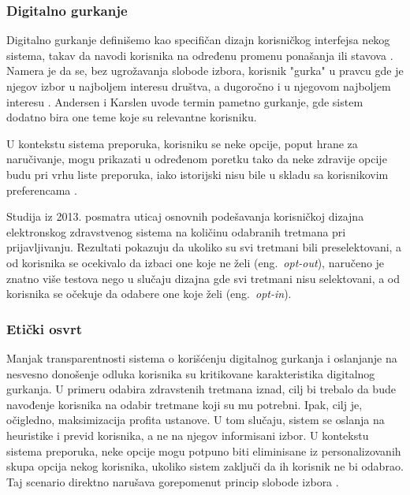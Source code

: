 \subsubsection{Digitalno gurkanje}
Digitalno gurkanje definišemo kao specifičan dizajn korisničkog interfejsa nekog sistema, takav da navodi korisnika na određenu promenu ponašanja ili stavova \cite{Weinmann_Schneider_Brocke_2016}. Namera je da se, bez ugrožavanja slobode izbora, korisnik "gurka" u pravcu gde je njegov izbor u najboljem interesu društva, a dugoročno i u njegovom najboljem interesu \cite{Karlsen_Andersen_2019}. Andersen i Karslen \cite{Karlsen_Andersen_2019} uvode termin pametno gurkanje, gde sistem dodatno bira one teme koje su relevantne korisniku. 

U kontekstu sistema preporuka, korisniku se neke opcije, poput hrane za naručivanje, mogu prikazati u određenom poretku tako da neke zdravije opcije budu pri vrhu liste preporuka, iako istorijski nisu bile u skladu sa korisnikovim preferencama \cite{Jesse_Jannach_2021}.

Studija iz 2013. \cite{Probst_Shaffer_Chan_2013} posmatra uticaj osnovnih podešavanja korisničkoj dizajna elektronskog zdravstvenog sistema na količinu odabranih tretmana pri prijavljivanju. Rezultati pokazuju da ukoliko su svi tretmani bili preselektovani, a od korisnika se ocekivalo da izbaci one koje ne želi (eng.~{\em opt-out}), naručeno je znatno više testova nego u slučaju dizajna gde svi tretmani nisu selektovani, a od korisnika se očekuje da odabere one koje želi (eng.~{\em opt-in}).

\subsubsection{Etički osvrt}
Manjak transparentnosti sistema o korišćenju digitalnog gurkanja i oslanjanje na nesvesno donošenje odluka korisnika \cite{Bruns_Kantorowicz_2018} su kritikovane karakteristika digitalnog gurkanja. U primeru odabira zdravstenih tretmana iznad, cilj bi trebalo da bude navođenje korisnika na odabir tretmane koji su mu potrebni. Ipak, cilj je, očigledno, maksimizacija profita ustanove. U tom slučaju, sistem se oslanja na heuristike i previd korisnika, a ne na njegov informisani izbor. U kontekstu sistema preporuka, neke opcije mogu potpuno biti eliminisane iz personalizovanih skupa opcija nekog korisnika, ukoliko sistem zaključi da ih korisnik ne bi odabrao. Taj scenario direktno narušava gorepomenut princip slobode izbora \cite{Jesse_Jannach_2021}.

